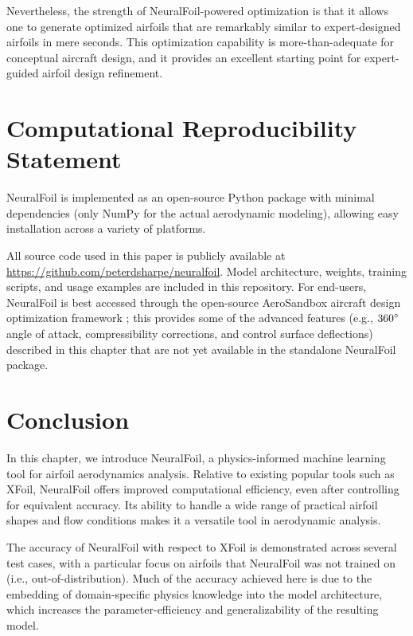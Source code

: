     Nevertheless, the strength of NeuralFoil-powered optimization is that it allows one to generate optimized airfoils that are remarkably similar to expert-designed airfoils in mere seconds. This optimization capability is more-than-adequate for conceptual aircraft design, and it provides an excellent starting point for expert-guided airfoil design refinement.


    \section{Computational Reproducibility Statement}
    \label{sec:nf-reproducibility}

    NeuralFoil is implemented as an open-source Python package with minimal dependencies (only NumPy \cite{harris_array_2020} for the actual aerodynamic modeling), allowing easy installation across a variety of platforms.

    All source code used in this paper is publicly available at \url{https://github.com/peterdsharpe/neuralfoil}. Model architecture, weights, training scripts, and usage examples are included in this repository.
    For end-users, NeuralFoil is best accessed through the open-source AeroSandbox aircraft design optimization framework \cite{sharpe_aerosandbox_2021}; this provides some of the advanced features (e.g., $360\degree$ angle of attack, compressibility corrections, and control surface deflections) described in this chapter that are not yet available in the standalone NeuralFoil package.


    \section{Conclusion}
    \label{sec:conclusion}

    In this chapter, we introduce NeuralFoil, a physics-informed machine learning tool for airfoil aerodynamics analysis. Relative to existing popular tools such as XFoil, NeuralFoil offers improved computational efficiency, even after controlling for equivalent accuracy. Its ability to handle a wide range of practical airfoil shapes and flow conditions makes it a versatile tool in aerodynamic analysis.

    The accuracy of NeuralFoil with respect to XFoil is demonstrated across several test cases, with a particular focus on airfoils that NeuralFoil was not trained on (i.e., out-of-distribution). Much of the accuracy achieved here is due to the embedding of domain-specific physics knowledge into the model architecture, which increases the parameter-efficiency and generalizability of the resulting model.

